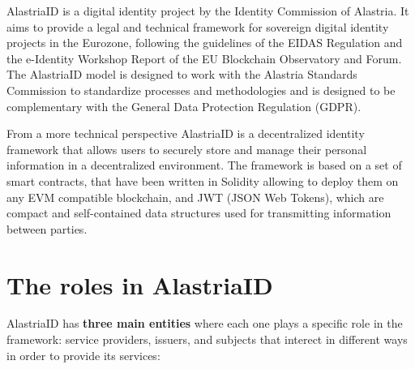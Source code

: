 \documentclass[target=mst,aauheader=]{thud}
\begin{document}
AlastriaID is a digital identity project by the Identity Commission of Alastria. It aims to provide a legal and technical framework for sovereign digital identity projects in the Eurozone, following the guidelines of the EIDAS \cite{EIDAS} Regulation and the e-Identity Workshop Report of the EU Blockchain Observatory and Forum. The AlastriaID model is designed to work with the Alastria Standards Commission to standardize processes and methodologies and is designed to be complementary with the General Data Protection Regulation (GDPR).\par
From a more technical perspective AlastriaID is a decentralized identity framework that allows users to securely store and manage their personal information in a decentralized environment. The framework is based on a set of smart contracts, that have been written in Solidity \cite{solidity} allowing to deploy them on any EVM compatible blockchain, and JWT (JSON Web Tokens), which are compact and self-contained data structures used for transmitting information between parties. 

\section{The roles in AlastriaID}

AlastriaID has \textbf{three main entities} where each one plays a specific role in the framework: service providers, issuers, and subjects that interect in different ways in order to provide its services:
\end{document}
